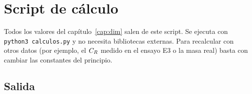 \chapter{Script de cálculo}\label{ap:script}

Todos los valores del capítulo~\ref{cap:dim} salen de este script. Se ejecuta con
\texttt{python3 calculos.py} y no necesita bibliotecas externas. Para recalcular con
otros datos (por ejemplo, el $C_{R}$ medido en el ensayo E3 o la masa real) basta con
cambiar las constantes del principio.



\section*{Salida}

